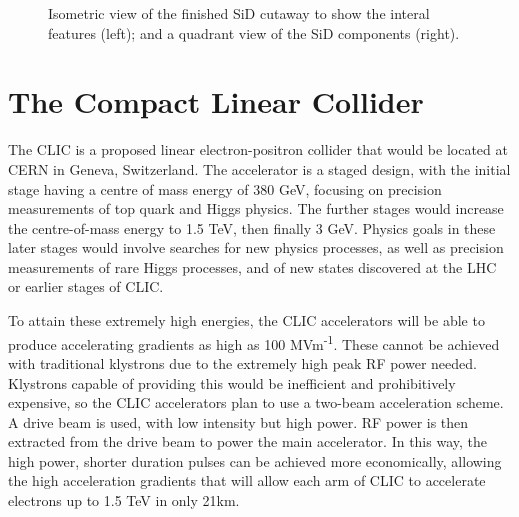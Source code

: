 \begin{figure}[t]%
	\centering
    \qquad
    \caption{Isometric view of the finished \acrshort{SiD} cutaway to show the interal features (left); and a quadrant view of the \acrshort{SiD} components (right).}%
    \label{figure:colliders/ILD/double}%
\end{figure}

\section{The Compact Linear Collider}
The \acrfull{CLIC} is a proposed linear electron-positron collider that would be located at \acrshort{CERN} in Geneva, Switzerland. The accelerator is a staged design, with the initial stage having a centre of mass energy of 380 GeV, focusing on precision measurements of top quark and Higgs physics. The further stages would increase the centre-of-mass energy to 1.5 TeV, then finally 3 GeV. Physics goals in these later stages would involve searches for new physics processes, as well as precision measurements of rare Higgs processes, and of new states discovered at the LHC or earlier stages of \acrshort{CLIC}. 

To attain these extremely high energies, the \acrshort{CLIC} accelerators will be able to produce accelerating gradients as high as 100 MVm\textsuperscript{-1}. These cannot be achieved with traditional klystrons due to the extremely high peak \acrshort{RF} power needed. Klystrons capable of providing this would be inefficient and prohibitively expensive, so the \acrshort{CLIC} accelerators plan to use a two-beam acceleration scheme. A drive beam is used, with low intensity but high power. \acrshort{RF} power is then extracted from the drive beam to power the main accelerator. In this way, the high power, shorter duration pulses can be achieved more economically, allowing the high acceleration gradients that will allow each arm of \acrshort{CLIC} to accelerate electrons up to 1.5 TeV in only 21km.


